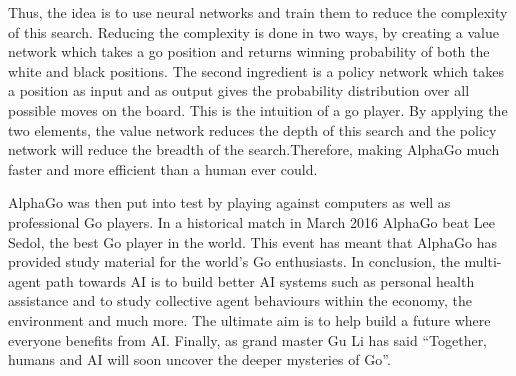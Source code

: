 \documentclass[11pt]{article} %
\begin{document}
Thus, the idea is to use neural networks and train them to reduce the complexity of this search. Reducing the complexity is done in two ways, by creating a value network which takes a go position and returns winning probability of both the white and black positions. The second ingredient is a policy network which takes a position as input and as output gives the probability distribution over all possible moves on the board. This is the intuition of a go player. By applying the two elements, the value network reduces the depth of this search and the policy network will reduce the breadth of the search.Therefore, making AlphaGo much faster and more efficient than a human ever could. 
\par

AlphaGo was then put into test by playing against computers as well as professional Go players. In a historical match in March 2016 AlphaGo beat Lee Sedol, the best Go player in the world. This event has meant that AlphaGo has provided study material for the world’s Go enthusiasts. In conclusion, the multi-agent path towards AI is to build better AI systems such as personal health assistance and to study collective agent behaviours within the economy, the environment and much more. The ultimate aim is to help build a future where everyone benefits from AI. Finally, as grand master Gu Li has said “Together, humans and AI will soon uncover the deeper mysteries of Go”. 
\end{document}
